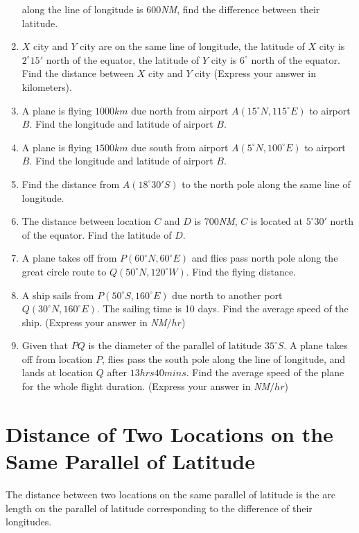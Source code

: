 \documentclass{report}
\begin{document}
\begin{multicols}{2}
\begin{enumerate}
              along the line of longitude is $600$\emph{NM}, find the difference between
              their latitude.
        \item $X$ city and $Y$ city are on the same line of longitude, the latitude of $X$ city is $2^\circ 15'$ north of the equator, the latitude of $Y$ city is $6^\circ$ north of the equator. Find the distance between $X$ city and $Y$ city (Express your answer in kilometers).
        \item A plane is flying $1000km$ due north from airport $A(15^\circ N, 115^\circ E)$
              to airport $B$. Find the longitude and latitude of airport $B$.
        \item A plane is flying $1500km$ due south from airport $A(5^\circ N, 100^\circ E)$
              to airport $B$. Find the longitude and latitude of airport $B$.
        \item Find the distance from $A(18^\circ 30' S)$ to the north pole along the same
              line of longitude.
        \item The distance between location $C$ and $D$ is $700$\emph{NM}, $C$ is located at
              $5^\circ 30'$ north of the equator. Find the latitude of $D$.
        \item A plane takes off from $P(60^\circ N, 60^\circ E)$ and flies pass north pole
              along the great circle route to $Q(50^\circ N, 120^\circ W)$. Find the flying
              distance.
        \item A ship sails from $P(50^\circ S, 160^\circ E)$ due north to another port
              $Q(30^\circ N, 160^\circ E)$. The sailing time is 10 days. Find the average
              speed of the ship. (Express your answer in \emph{NM}$/hr$)
        \item Given that $PQ$ is the diameter of the parallel of latitude $35^\circ S$. A
              plane takes off from location $P$, flies pass the south pole along the line of
              longitude, and lands at location $Q$ after $13hrs 40mins$. Find the average
              speed of the plane for the whole flight duration. (Express your answer in
              \emph{NM}$/hr$)
    \end{enumerate}

    \section{Distance of Two Locations on the Same Parallel of Latitude}

    The distance between two locations on the same parallel of latitude is the arc
    length on the parallel of latitude corresponding to the difference of their
    longitudes.


\end{multicols}
\end{document}
